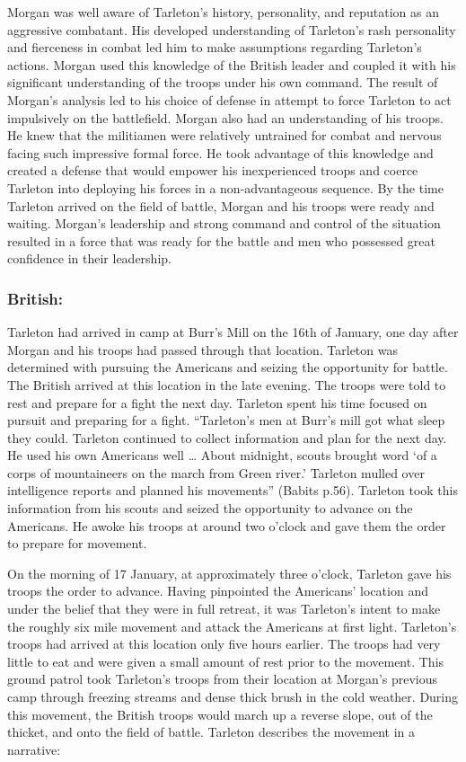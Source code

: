 Morgan was well aware of Tarleton's history, personality, and reputation as an
aggressive combatant.  His developed understanding of Tarleton's rash
personality and fierceness in combat led him to make assumptions regarding
Tarleton's actions.  Morgan used this knowledge of the British leader and
coupled it with his significant understanding of the troops under his own
command.  The result of Morgan’s analysis led to his choice of defense in
attempt to force Tarleton to act impulsively on the battlefield.  Morgan also
had an understanding of his troops.  He knew that the militiamen were
relatively untrained for combat and nervous facing such impressive formal
force.  He took advantage of this knowledge and created a defense that would
empower his inexperienced troops and coerce Tarleton into deploying his forces
in a non-advantageous sequence.   By the time Tarleton arrived on the field of
battle, Morgan and his troops were ready and waiting.  Morgan's leadership and
strong command and control of the situation resulted in a force that was ready
for the battle and men who possessed great confidence in their leadership.

\subsubsection{British:}

Tarleton had arrived in camp at Burr’s Mill on the 16th of January, one day
after Morgan and his troops had passed through that location.  Tarleton was
determined with pursuing the Americans and seizing the opportunity for battle.
The British arrived at this location in the late evening.   The troops were told
to rest and prepare for a fight the next day.  Tarleton spent his time focused
on pursuit and preparing for a fight.  “Tarleton’s men at Burr’s mill got what
sleep they could.  Tarleton continued to collect information and plan for the
next day.  He used his own Americans well … About midnight, scouts brought word
‘of a corps of mountaineers on the march from Green river.’ Tarleton mulled over
intelligence reports and planned his movements” (Babits p.56).  Tarleton took
this information from his scouts and seized the opportunity to advance on the
Americans.  He awoke his troops at around two o’clock and gave them the order to
prepare for movement.

On the morning of 17 January, at approximately three o’clock, Tarleton gave his
troops the order to advance.  Having pinpointed the Americans’ location and
under the belief that they were in full retreat, it was Tarleton’s intent to
make the roughly six mile movement and attack the Americans at first light.
Tarleton’s troops had arrived at this location only five hours earlier.  The
troops had very little to eat and were given a small amount of rest prior to the
movement.  This ground patrol took Tarleton’s troops from their location at
Morgan’s previous camp through freezing streams and dense thick brush in the
cold weather.  During this movement, the British troops would march up a reverse
slope, out of the thicket, and onto the field of battle.   Tarleton describes
the movement in a narrative:

